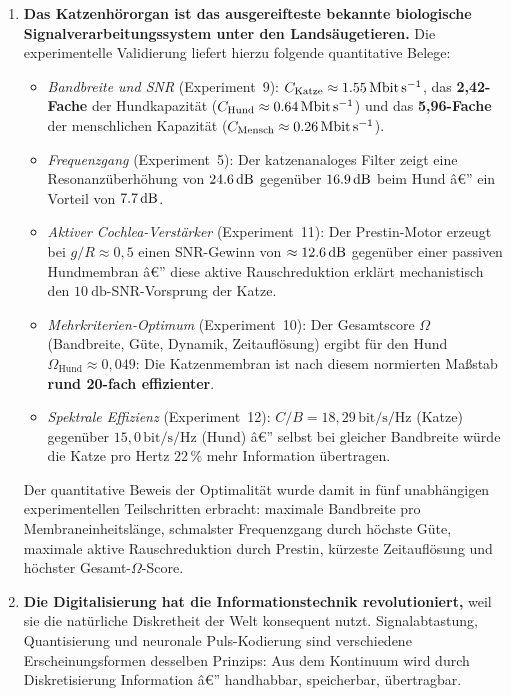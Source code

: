 ﻿\documentclass[12pt,a4paper,titlepage]{report}
\begin{document}
\begin{enumerate}[leftmargin=2em, label=\textbf{\arabic{enumi}.}]
	\item \textbf{Das Katzenhörorgan ist das ausgereifteste bekannte biologische
		Signalverarbeitungssystem unter den Landsäugetieren.}
		Die experimentelle Validierung liefert hierzu folgende
		quantitative Belege:
		\begin{itemize}[leftmargin=1.5em]
			\item \emph{Bandbreite und SNR} (Experiment~9):
				$C_{\mathrm{Katze}}\approx\SI{1{,}55}{\mega\bit\per\second}$,
				das \textbf{2,42-Fache} der Hundkapazität
				($C_{\mathrm{Hund}}\approx\SI{0{,}64}{\mega\bit\per\second}$)
				und das \textbf{5,96-Fache} der menschlichen Kapazität
				($C_{\mathrm{Mensch}}\approx\SI{0{,}26}{\mega\bit\per\second}$).
			\item \emph{Frequenzgang} (Experiment~5):
				Der katzenanaloges Filter zeigt eine Resonanzüberhöhung
				von $\SI{24{,}6}{\decibel}$ gegenüber $\SI{16{,}9}{\decibel}$
				beim Hund â€” ein Vorteil von $\SI{7{,}7}{\decibel}$.
			\item \emph{Aktiver Cochlea-Verstärker} (Experiment~11):
				Der Prestin-Motor erzeugt bei $g/R\approx0{,}5$
				einen SNR-Gewinn von $\approx\SI{12{,}6}{\decibel}$
				gegenüber einer passiven Hundmembran â€”
				diese aktive Rauschreduktion erklärt mechanistisch
				den $\SI{10}{\decibel}$-SNR-Vorsprung der Katze.
			\item \emph{Mehrkriterien-Optimum} (Experiment~10):
				Der Gesamtscore $\Omega$ (Bandbreite, Güte,
				Dynamik, Zeitauflösung) ergibt für den Hund
				$\Omega_{\mathrm{Hund}}\approx0{,}049$:
				Die Katzenmembran ist nach diesem normierten
				Maßstab \textbf{rund 20-fach effizienter}.
			\item \emph{Spektrale Effizienz} (Experiment~12):
				$C/B=18{,}29\,\mathrm{bit/s/Hz}$ (Katze)
				gegenüber $15{,}0\,\mathrm{bit/s/Hz}$ (Hund) â€”
				selbst bei gleicher Bandbreite würde die Katze
				pro Hertz $22\,\%$ mehr Information übertragen.
		\end{itemize}
		Der quantitative Beweis der Optimalität wurde damit in
		fünf unabhängigen experimentellen Teilschritten erbracht:
		maximale Bandbreite pro Membraneinheitslänge,
		schmalster Frequenzgang durch höchste Güte,
		maximale aktive Rauschreduktion durch Prestin,
		kürzeste Zeitauflösung und höchster Gesamt-$\Omega$-Score.

	\item \textbf{Die Digitalisierung hat die Informationstechnik revolutioniert,}
		weil sie die natürliche Diskretheit der Welt konsequent nutzt.
		Signalabtastung, Quantisierung und neuronale Puls-Kodierung
		sind verschiedene Erscheinungsformen desselben Prinzips:
		Aus dem Kontinuum wird durch Diskretisierung Information â€”
		handhabbar, speicherbar, übertragbar.

\end{enumerate}
\end{document}

